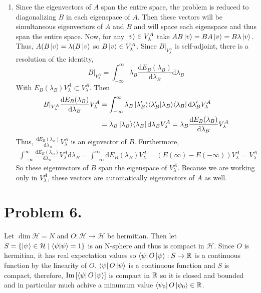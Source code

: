 \documentclass[12pt]{extarticle}
\begin{document}
\begin{enumerate}
\item Since the eigenvectors of $A$ span the entire space, the problem is reduced to diagonalizing $B$ in each eigenspace of $A$. Then these vectors will be simultaneous eigenvectors of $A$ and $B$ and will space each eigenspace and thus span the entire space. Now, for any $\left| v \right> \in V_\lambda^A$ take $AB \left| v \right> = BA \left| v \right> = B \lambda \left| v \right>$. Thus, $A(B \left| v \right> = \lambda (B \left| v \right>$ so $B \left| v \right> \in V_\lambda^A$. Since $B|_{V_\lambda^A}$ is self-adjoint, there is a resolution of the identity, \[B|_{V_\lambda^A} = \int_{-\infty}^{\infty} \lambda_B \frac{\mathrm{d} E_B(\lambda_B)}{\mathrm{d} \lambda_B} \mathrm{d} \lambda_B \]
With $E_B(\lambda_B) V_\lambda^A \subset V_\lambda^A$. Then 
\begin{align*}
B|_{V_\lambda^A} \frac{\mathrm{d} E_B(\lambda_B)}{\mathrm{d} \lambda_B} V_\lambda^A &= \int_{-\infty}^{\infty} \lambda_B \left| \lambda_B' \right>\! \left< \lambda_B' | \lambda_B \right>\! \left< \lambda_B \right| \mathrm{d} \lambda_B' V_\lambda^A \\ &= \lambda_B \left| \lambda_B \right>\! \left< \lambda_B \right| \mathrm{d} \lambda_B V_\lambda^A = \lambda_B \frac{\mathrm{d} E_B(\lambda_B)}{\mathrm{d} \lambda_B} V_\lambda^A 
\end{align*}
Thus, $\frac{\mathrm{d} E_B(\lambda_B)}{\mathrm{d} \lambda_B} V_\lambda^A$ is an eignvector of $B$. Furthermore, 
\begin{align*}
\int_{-\infty}^{\infty} \frac{\mathrm{d} E_B(\lambda_B)}{\mathrm{d} \lambda_B} V_\lambda^A \mathrm{d} \lambda_B = \int_{-\infty}^{\infty} \mathrm{d} E_B(\lambda_B) V_\lambda^A = (E(\infty) - E(-\infty))V_\lambda^A = V_\lambda^A
\end{align*}
So these eigenvectors of $B$ span the eigenspace of $V_\lambda^A$. Because we are working only in $V_\lambda^A$, these vectors are automatically eigenvectors of $A$ as well. 
\end{enumerate}



\section*{Problem 6.} Let $\dim{\mathcal{H}} = N$ and $O : \mathcal{H} \rightarrow \mathcal{H}$ be hermitian. Then let $S = \{ \left| \psi \right> \in \mathcal{H} \mid \left< \psi | \psi \right> = 1 \}$ is an N-sphere and thus is compact in $\mathcal{H}$. Since $O$ is hermitian, it has real expectation values so $\left< \psi \right| O \left| \psi \right> : S \rightarrow \mathbb{R}$ is a continuous function by the linearity of $O$. $\left< \psi \right| O \left| \psi \right>$ is a continuous function and $S$ is compact, therefore, $\mathrm{Im}\left[ \left< \psi \right| O \left| \psi \right> \right]$ is compact in $\mathbb{R}$ so it is closed and bounded and in particular much achive a minumum value $\left< \psi_0 \right| O \left| \psi_0 \right> \in \mathbb{R}$.
\end{document}
